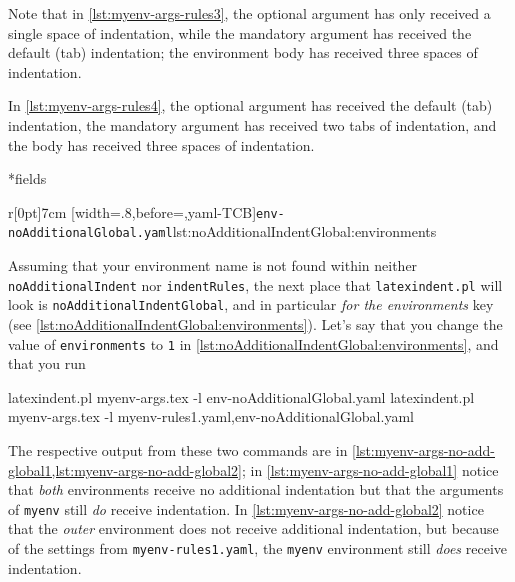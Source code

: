 Note that in \cref{lst:myenv-args-rules3}, the optional argument has only received a single space of indentation, while the mandatory argument 
has received the default (tab) indentation; the environment body has received three spaces of indentation.

In \cref{lst:myenv-args-rules4}, the optional argument has received the default (tab) indentation, the mandatory argument has received two tabs
of indentation, and the body has received three spaces of indentation.

*{fields}
\begin{wrapfigure}[6]{r}[0pt]{7cm}
[width=.8\linewidth,before=\centering,yaml-TCB]{\texttt{env-noAdditionalGlobal.yaml}}{lst:noAdditionalIndentGlobal:environments}
\end{wrapfigure}
Assuming that your environment name is not found within neither \texttt{noAdditionalIndent} nor \texttt{indentRules}, the next
place that \texttt{latexindent.pl} will look is \texttt{noAdditionalIndentGlobal}, and in particular \emph{for the environments} key
(see \cref{lst:noAdditionalIndentGlobal:environments}). Let's say that you change
the value of \texttt{environments} to \texttt{1} in \cref{lst:noAdditionalIndentGlobal:environments}, and that you run

\begin{sidebyside}
\begin{commandshell}
latexindent.pl myenv-args.tex -l env-noAdditionalGlobal.yaml
latexindent.pl myenv-args.tex -l myenv-rules1.yaml,env-noAdditionalGlobal.yaml
\end{commandshell}
\end{sidebyside}

The respective output from these two commands are in \cref{lst:myenv-args-no-add-global1,lst:myenv-args-no-add-global2}; in \cref{lst:myenv-args-no-add-global1} notice that \emph{both}
environments receive no additional indentation but that the arguments of \texttt{myenv} still \emph{do} receive indentation. In \cref{lst:myenv-args-no-add-global2}
notice that the \emph{outer} environment does not receive additional indentation, but because of the settings from \texttt{myenv-rules1.yaml}, the \texttt{myenv}
environment still \emph{does} receive indentation.

\begin{minipage}{.45\textwidth}
\end{minipage}
\hfill
\begin{minipage}{.45\textwidth}
\end{minipage}

